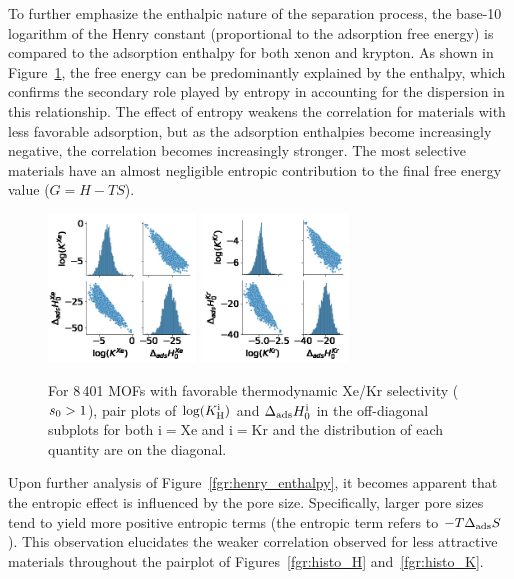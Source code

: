 \documentclass[main.tex]{subfiles}
\begin{document}
To further emphasize the enthalpic nature of the separation process, the base-10 logarithm of the Henry constant (proportional to the adsorption free energy) is compared to the adsorption enthalpy for both xenon and krypton. As shown in Figure~\ref{fgr:SI:HK}, the free energy can be predominantly explained by the enthalpy, which confirms the secondary role played by entropy in accounting for the dispersion in this relationship. The effect of entropy weakens the correlation for materials with less favorable adsorption, but as the adsorption enthalpies become increasingly negative, the correlation becomes increasingly stronger. The most selective materials have an almost negligible entropic contribution to the final free energy value ($G=H-TS$).

\begin{figure}[ht]
  \centering
    \includegraphics[width=0.35\textwidth]{figures/2-thermo/H_K_Xe.jpg}
    \includegraphics[width=0.35\textwidth]{figures/2-thermo/H_K_Kr.jpg}
    \caption{For 8\,401 MOFs with favorable thermodynamic Xe/Kr selectivity ($s_{\text{0}} > 1$), pair plots of $\log(K_{\text{H}}^{\text{i}})$ and $\Delta_{\text{ads}}H^{\text{i}}_{\text{0}}$ in the off-diagonal subplots for both i$=$Xe and i$=$Kr and the distribution of each quantity are on the diagonal.}\label{fgr:SI:HK}
\end{figure}

Upon further analysis of Figure~\ref{fgr:henry_enthalpy}, it becomes apparent that the entropic effect is influenced by the pore size. Specifically, larger pore sizes tend to yield more positive entropic terms (the entropic term refers to $-T\Delta_{\text{ads}}S$). This observation elucidates the weaker correlation observed for less attractive materials throughout the pairplot of Figures~\ref{fgr:histo_H} and~\ref{fgr:histo_K}.
\end{document}
